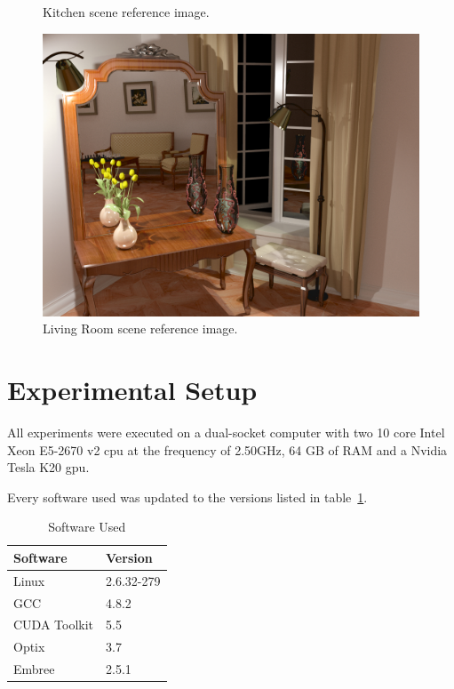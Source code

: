 \begin{figure}[h]
\begin{minipage}[b]{0.3\linewidth}
\caption{\label{img:kitchen_ref} Kitchen scene reference image.}
\end{minipage}
\quad
\begin{minipage}[b]{0.3\linewidth}
\includegraphics[width=\linewidth]{img/livingroom_ref.jpg}
\caption{\label{img:livingroom_ref} Living Room scene reference image.}
\end{minipage}

\end{figure}

\section{Experimental Setup}

All experiments were executed on a dual-socket computer with two 10 core Intel Xeon E5-2670 v2 \gls{cpu} at the frequency of 2.50GHz, 64 GB of RAM and a Nvidia Tesla K20 \gls{gpu}.

Every software used was updated to the versions listed in table~\ref{tab:soft_ver}.

\begin{table}[h]
\centering
\begin{tabular}{|l|l|}

\hline
Software & Version \\
\hline
Linux & 2.6.32-279 \\
\hline
GCC & 4.8.2 \\
\hline
CUDA Toolkit & 5.5 \\
\hline
Optix & 3.7 \\
\hline
Embree & 2.5.1 \\
\hline

\end{tabular}
\caption{\label{tab:soft_ver} Software Used}
\end{table}

